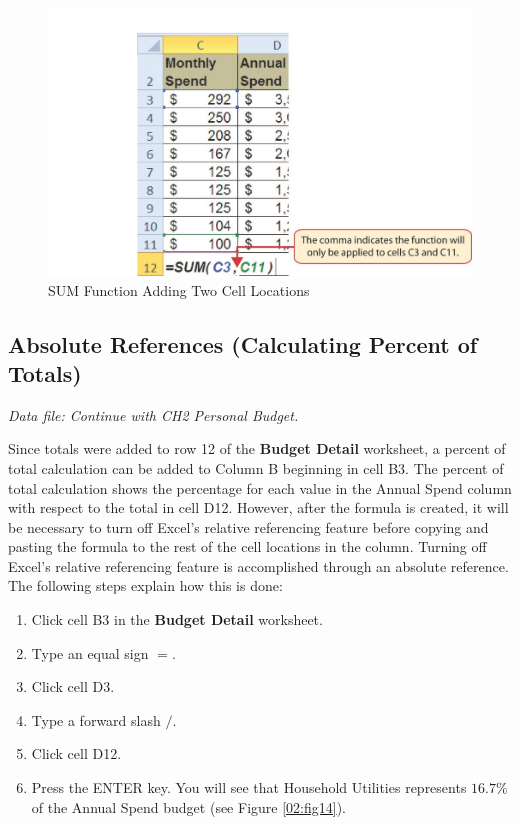\begin{figure}[H]
	\centering
	\includegraphics[width=\maxwidth{.95\linewidth}]{gfx/ch02_fig13}
	\caption{SUM Function Adding Two Cell Locations}
	\label{02:fig13}
\end{figure}

\subsection{Absolute References (Calculating Percent of Totals)}

\textit{Data file: Continue with CH2 Personal Budget.}

Since totals were added to row 12 of the \textbf{Budget Detail} worksheet, a percent of total calculation can be added to Column B beginning in cell \textsf{B3}. The percent of total calculation shows the percentage for each value in the Annual Spend column with respect to the total in cell \textsf{D12}. However, after the formula is created, it will be necessary to turn off Excel's relative referencing feature before copying and pasting the formula to the rest of the cell locations in the column. Turning off Excel's relative referencing feature is accomplished through an absolute reference. The following steps explain how this is done:

\begin{enumerate}
	\item Click cell \textsf{B3} in the \textbf{Budget Detail} worksheet.
	\item Type an equal sign $ = $.
	\item Click cell \textsf{D3}.
	\item Type a forward slash $ / $.
	\item Click cell \textsf{D12}.
	\item Press the ENTER key. You will see that Household Utilities represents $ 16.7\% $ of the Annual Spend budget (see Figure \ref{02:fig14}).
\end{enumerate}

